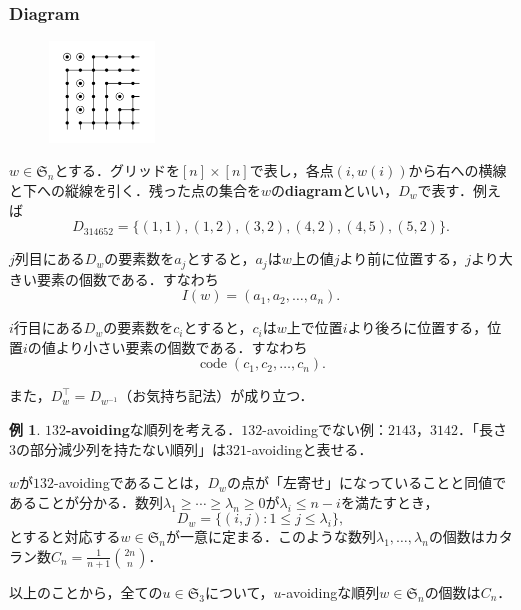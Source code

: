 \documentclass[xelatex,ja=standard,a4paper,14pt,everyparhook=compat]{bxjsarticle}
\newcommand{\fS}{\mathfrak{S}}
\theoremstyle{definition}
\newtheorem{example}[theorem]{例}
\begin{document}
\subsubsection{Diagram}

\begin{figure}
    \centering
    \includegraphics[width=0.25\textwidth]{fig1.5.png}
\end{figure}

$w \in \fS_n$とする．グリッドを$[n] \times [n]$で表し，各点$(i, w(i))$から右への横線と下への縦線を引く．残った点の集合を$w$の\textbf{diagram}といい，$D_w$で表す．例えば \begin{equation*}
    D_{314652} = \{(1,1), (1,2), (3,2), (4,2), (4,5), (5,2)\}.
\end{equation*}

$j$列目にある$D_w$の要素数を$a_j$とすると，$a_j$は$w$上の値$j$より前に位置する，$j$より大きい要素の個数である．すなわち \begin{equation*}
    I(w) = (a_1, a_2, \ldots, a_n).
\end{equation*}

$i$行目にある$D_w$の要素数を$c_i$とすると，$c_i$は$w$上で位置$i$より後ろに位置する，位置$i$の値より小さい要素の個数である．すなわち \begin{equation*}
    \operatorname{code}(c_1, c_2, \ldots, c_n).
\end{equation*}

また，$D_w^\top = D_{w^{-1}}$（お気持ち記法）が成り立つ．

\begin{example}
    \textbf{$132$-avoiding}な順列を考える．$132$-avoidingでない例：$2143$，$3142$．「長さ$3$の部分減少列を持たない順列」は$321$-avoidingと表せる．

    $w$が$132$-avoidingであることは，$D_w$の点が「左寄せ」になっていることと同値であることが分かる．数列$\lambda_1 \geq \cdots \geq \lambda_n \geq 0$が$\lambda_i \leq n-i$を満たすとき， \begin{equation*}
        D_w = \{(i, j) : 1 \leq j \leq \lambda_i\},
    \end{equation*}
    とすると対応する$w \in \fS_n$が一意に定まる．このような数列$\lambda_1, \ldots, \lambda_n$の個数はカタラン数$C_n = \frac{1}{n+1} \binom{2n}{n}$．

    以上のことから，全ての$u \in \fS_3$について，$u$-avoidingな順列$w \in \fS_n$の個数は$C_n$．
\end{example}
\end{document}

